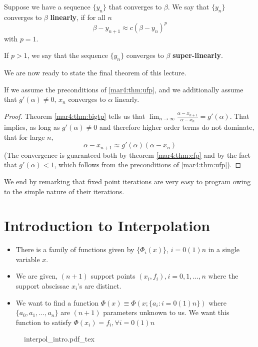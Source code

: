 \begin{defn}
	Suppose we have a sequence $\{y_n \}$ that converges to $\beta$. We say that $\{y_n \}$ converges to $\beta$ \textbf{linearly}, if for all $n$
	\[
		\beta - y_{n+1} \approx c(\beta - y_n)^p
	\]
	with $p = 1$.

	If $p > 1$, we say that the sequence $\{y_n \}$ converges to $\beta$ \textbf{super-linearly}.
\end{defn}
We are now ready to state the final theorem of this lecture.
\begin{thm}
	If we assume the preconditions of \ref{mar4:thm:ufp}, and we additionally assume that $g'(\alpha) \neq 0$, $x_n$ converges to $\alpha$ linearly.
\end{thm}
\begin{proof}
	Theorem \ref{mar4:thm:bigtp} tells us that $\lim_{n\to\infty} \frac{\alpha - x_{n+1}}{\alpha - x_n} = g'(\alpha)$. That implies, as long as $g'(\alpha) \neq 0$ and therefore higher order terms do not dominate, that for large $n$,
	\[
		\alpha - x_{n+1} \approx g'(\alpha)(\alpha - x_n)
	\]
	(The convergence is guaranteed both by theorem \ref{mar4:thm:efp} and by the fact that $g'(\alpha) < 1$, which follows from the preconditions of \ref{mar4:thm:ufp}).
	\hfill
\end{proof}

We end by remarking that fixed point iterations are very easy to program owing to the simple nature of their iterations.

\newpage
\section{Introduction to Interpolation}
\begin{itemize}
	\item There is a family of functions given by $ \{\Phi_i(x)\} $, $i = 0(1)n$ in a single variable $ x $.
	\item We are given, $ (n+1) $ support points $ (x_i,f_i), i=0,1,\ldots,n $  where the support abscissae $ x_i $'s are distinct.
	\item We want to find a function $\Phi (x) \equiv \Phi (x; \{ a_i: i = 0(1)n \})$ where $ \{a_0,a_1,\ldots,a_n\} $ are $ (n+1) $ parameters  unknown to us. We want this function to satisfy $\Phi (x_i) = f_i,  \forall i = 0(1)n$
\end{itemize}

\begin{figure}[H]
	\centering
	\def\svgwidth{0.8\textwidth}
	{interpol_intro.pdf_tex}
	\caption{}
	\label{fig1:mar4}
\end{figure}

